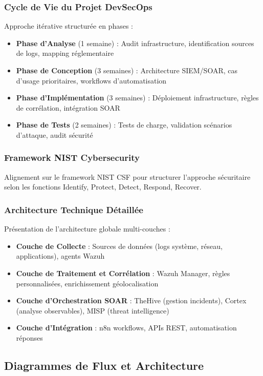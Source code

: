 \subsubsection{Cycle de Vie du Projet DevSecOps}
Approche itérative structurée en phases :
\begin{itemize}
    \item \textbf{Phase d'Analyse} (1 semaine) : Audit infrastructure, identification sources de logs, mapping réglementaire
    \item \textbf{Phase de Conception} (3 semaines) : Architecture SIEM/SOAR, cas d'usage prioritaires, workflows d'automatisation
    \item \textbf{Phase d'Implémentation} (3 semaines) : Déploiement infrastructure, règles de corrélation, intégration SOAR
    \item \textbf{Phase de Tests} (2 semaines) : Tests de charge, validation scénarios d'attaque, audit sécurité
\end{itemize}

\subsubsection{Framework NIST Cybersecurity}
Alignement sur le framework NIST CSF pour structurer l'approche sécuritaire selon les fonctions Identify, Protect, Detect, Respond, Recover.

\newpage
\subsubsection{Architecture Technique Détaillée}
Présentation de l'architecture globale multi-couches :
\begin{itemize}
    \item \textbf{Couche de Collecte} : Sources de données (logs système, réseau, applications), agents Wazuh
    \item \textbf{Couche de Traitement et Corrélation} : Wazuh Manager, règles personnalisées, enrichissement géolocalisation
    \item \textbf{Couche d'Orchestration SOAR} : TheHive (gestion incidents), Cortex (analyse observables), MISP (threat intelligence)
    \item \textbf{Couche d'Intégration} : n8n workflows, APIs REST, automatisation réponses
\end{itemize}

\subsection{Diagrammes de Flux et Architecture}

